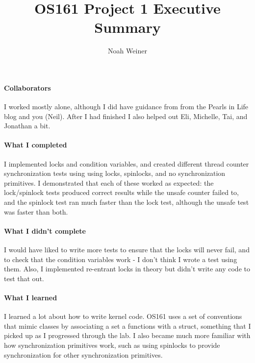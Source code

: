 \documentclass{article}
\title{OS161 Project 1 Executive Summary}
\author{Noah Weiner}
\begin{document}
\date{}
\maketitle

\paragraph{Collaborators} I worked mostly alone, although I did have guidance from from the Pearls in Life blog and you (Neil). After I had finished I also helped out Eli, Michelle, Tai, and Jonathan a bit.

\paragraph{What I completed} I implemented locks and condition variables, and created different thread counter synchronization tests using using locks, spinlocks, and no synchronization primitives. I demonstrated that each of these worked as expected: the lock/spinlock tests produced correct results while the unsafe counter failed to, and the spinlock test ran much faster than the lock test, although the unsafe test was faster than both.

\paragraph{What I didn't complete} I would have liked to write more tests to ensure that the locks will never fail, and to check that the condition variables work - I don't think I wrote a test using them. Also, I implemented re-entrant locks in theory but didn't write any code to test that out.

\paragraph{What I learned} I learned a lot about how to write kernel code. OS161 uses a set of conventions that mimic classes by associating a set a functions with a struct, something that I picked up as I progressed through the lab. I also became much more familiar with how synchronization primitives work, such as using spinlocks to provide synchronization for other synchronization primitives.
\end{document}

